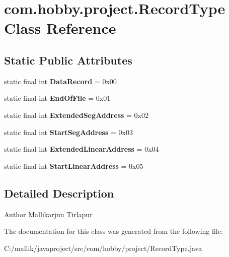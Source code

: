 \hypertarget{classcom_1_1hobby_1_1project_1_1_record_type}{}\section{com.\+hobby.\+project.\+Record\+Type Class Reference}
\label{classcom_1_1hobby_1_1project_1_1_record_type}
\subsection*{Static Public Attributes}
\begin{DoxyCompactItemize}
\item 
\mbox{\label{classcom_1_1hobby_1_1project_1_1_record_type_a24e6c85c86a38ba11af14789dfdfbaaf}} 
static final int {\bfseries Data\+Record} = 0x00
\item 
\mbox{\label{classcom_1_1hobby_1_1project_1_1_record_type_af21d7c2e8f1a55998e64bb9eae25baf6}} 
static final int {\bfseries End\+Of\+File} = 0x01
\item 
\mbox{\label{classcom_1_1hobby_1_1project_1_1_record_type_a27afe3004dcb48b4df349511a8e5efec}} 
static final int {\bfseries Extended\+Seg\+Address} = 0x02
\item 
\mbox{\label{classcom_1_1hobby_1_1project_1_1_record_type_a699b1fb66bd5087eaef7f90d506da972}} 
static final int {\bfseries Start\+Seg\+Address} = 0x03
\item 
\mbox{\label{classcom_1_1hobby_1_1project_1_1_record_type_a8e0ca2de1d6bba283ccc1834d04a9b76}} 
static final int {\bfseries Extended\+Linear\+Address} = 0x04
\item 
\mbox{\label{classcom_1_1hobby_1_1project_1_1_record_type_af23773aa176dc7bd292da7fa0990946d}} 
static final int {\bfseries Start\+Linear\+Address} = 0x05
\end{DoxyCompactItemize}


\subsection{Detailed Description}
\begin{DoxyAuthor}{Author}
Mallikarjun Tirlapur 
\end{DoxyAuthor}


The documentation for this class was generated from the following file\+:\begin{DoxyCompactItemize}
\item 
C\+:/mallik/javaproject/src/com/hobby/project/Record\+Type.\+java\end{DoxyCompactItemize}
